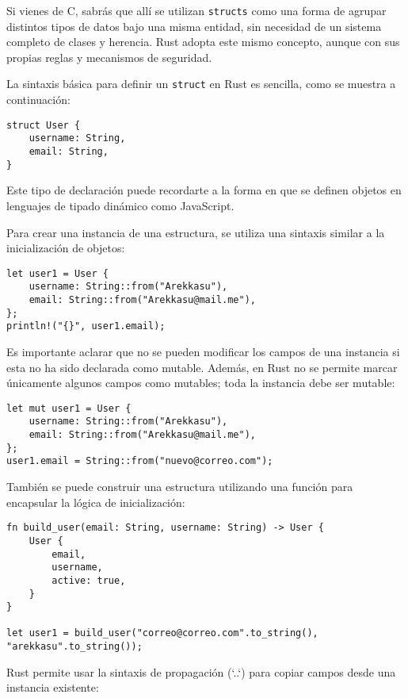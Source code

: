 \documentclass[12pt]{article}
\begin{document}
Si vienes de C, sabrás que allí se utilizan \texttt{structs} como una forma de agrupar distintos tipos de datos bajo una misma entidad, sin necesidad de un sistema completo de clases y herencia. Rust adopta este mismo concepto, aunque con sus propias reglas y mecanismos de seguridad.

La sintaxis básica para definir un \texttt{struct} en Rust es sencilla, como se muestra a continuación:

\begin{lstlisting}[style=ruststyle]
struct User {
	username: String,
	email: String,
}
\end{lstlisting}

Este tipo de declaración puede recordarte a la forma en que se definen objetos en lenguajes de tipado dinámico como JavaScript.

Para crear una instancia de una estructura, se utiliza una sintaxis similar a la inicialización de objetos:

\begin{lstlisting}[style=ruststyle]
let user1 = User {
	username: String::from("Arekkasu"),
	email: String::from("Arekkasu@mail.me"),
};
println!("{}", user1.email);
\end{lstlisting}

Es importante aclarar que no se pueden modificar los campos de una instancia si esta no ha sido declarada como mutable. Además, en Rust no se permite marcar únicamente algunos campos como mutables; toda la instancia debe ser mutable:

\begin{lstlisting}[style=ruststyle]
let mut user1 = User {
	username: String::from("Arekkasu"),
	email: String::from("Arekkasu@mail.me"),
};
user1.email = String::from("nuevo@correo.com");
\end{lstlisting}

También se puede construir una estructura utilizando una función para encapsular la lógica de inicialización:

\begin{lstlisting}[style=ruststyle]
fn build_user(email: String, username: String) -> User {
	User {
		email,
		username,
		active: true,
	}
}

let user1 = build_user("correo@correo.com".to_string(), "arekkasu".to_string());
\end{lstlisting}

Rust permite usar la sintaxis de propagación (`..`) para copiar campos desde una instancia existente:
\end{document}
